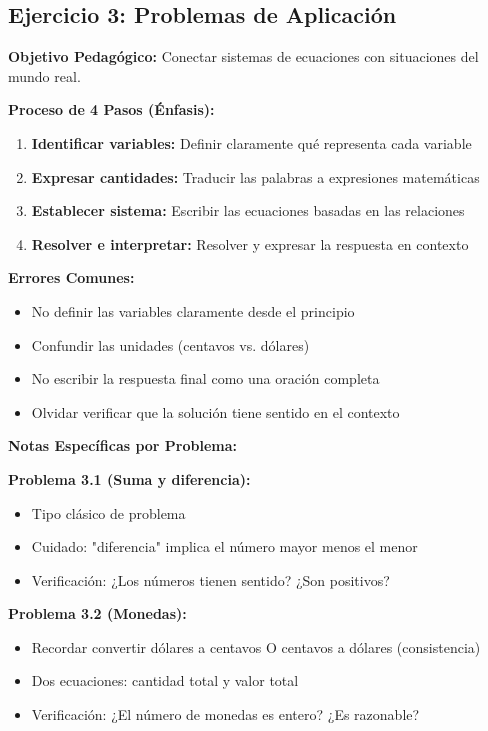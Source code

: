 \subsection*{Ejercicio 3: Problemas de Aplicación}

\textbf{Objetivo Pedagógico:} Conectar sistemas de ecuaciones con situaciones del mundo real.

\textbf{Proceso de 4 Pasos (Énfasis):}

\begin{enumerate}
    \item \textbf{Identificar variables:} Definir claramente qué representa cada variable
    \item \textbf{Expresar cantidades:} Traducir las palabras a expresiones matemáticas
    \item \textbf{Establecer sistema:} Escribir las ecuaciones basadas en las relaciones
    \item \textbf{Resolver e interpretar:} Resolver y expresar la respuesta en contexto
\end{enumerate}

\textbf{Errores Comunes:}

\begin{itemize}
    \item No definir las variables claramente desde el principio
    \item Confundir las unidades (centavos vs. dólares)
    \item No escribir la respuesta final como una oración completa
    \item Olvidar verificar que la solución tiene sentido en el contexto
\end{itemize}

\textbf{Notas Específicas por Problema:}

\textbf{Problema 3.1 (Suma y diferencia):}
\begin{itemize}
    \item Tipo clásico de problema
    \item Cuidado: "diferencia" implica el número mayor menos el menor
    \item Verificación: ¿Los números tienen sentido? ¿Son positivos?
\end{itemize}

\textbf{Problema 3.2 (Monedas):}
\begin{itemize}
    \item Recordar convertir dólares a centavos O centavos a dólares (consistencia)
    \item Dos ecuaciones: cantidad total y valor total
    \item Verificación: ¿El número de monedas es entero? ¿Es razonable?
\end{itemize}

